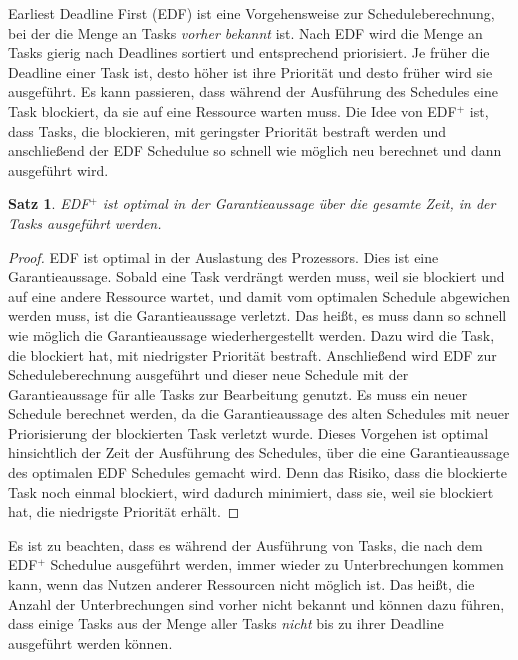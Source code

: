 \documentclass{scrarticle}
\newtheorem{satz}{Satz}[section]
\numberwithin{equation}{section}
\begin{document}
Earliest Deadline First (EDF) ist eine Vorgehensweise zur Scheduleberechnung, bei der die Menge an Tasks \textit{vorher bekannt} ist. Nach EDF wird die Menge an Tasks gierig nach Deadlines sortiert und entsprechend priorisiert. Je früher die Deadline einer Task ist, desto höher ist ihre Priorität und desto früher wird sie ausgeführt. Es kann passieren, dass während der Ausführung des Schedules eine Task blockiert, da sie auf eine Ressource warten muss. Die Idee von EDF$^+$ ist, dass Tasks, die blockieren, mit geringster Priorität bestraft werden und anschließend der EDF Schedulue so schnell wie möglich neu berechnet und dann ausgeführt wird.
\begin{satz}
	\label{satz:edf+}
	EDF$^+$ ist optimal in der Garantieaussage über die gesamte Zeit, in der Tasks ausgeführt werden.
\end{satz}
\begin{proof}
	EDF ist optimal in der Auslastung des Prozessors. Dies ist eine Garantieaussage. Sobald eine Task verdrängt werden muss, weil sie blockiert und auf eine andere Ressource wartet, und damit vom optimalen Schedule abgewichen werden muss, ist die Garantieaussage verletzt. Das heißt, es muss dann so schnell wie möglich die Garantieaussage wiederhergestellt werden. Dazu wird die Task, die blockiert hat, mit niedrigster Priorität bestraft. Anschließend wird EDF zur Scheduleberechnung ausgeführt und dieser neue Schedule mit der Garantieaussage für alle Tasks zur Bearbeitung genutzt. Es muss ein neuer Schedule berechnet werden, da die Garantieaussage des alten Schedules mit neuer Priorisierung der blockierten Task verletzt wurde. Dieses Vorgehen ist optimal hinsichtlich der Zeit der Ausführung des Schedules, über die eine Garantieaussage des optimalen EDF Schedules gemacht wird. Denn das Risiko, dass die blockierte Task noch einmal blockiert, wird dadurch minimiert, dass sie, weil sie blockiert hat, die niedrigste Priorität erhält.
\end{proof}
Es ist zu beachten, dass es während der Ausführung von Tasks, die nach dem EDF$^+$ Schedulue ausgeführt werden, immer wieder zu Unterbrechungen kommen kann, wenn das Nutzen anderer Ressourcen nicht möglich ist. Das heißt, die Anzahl der Unterbrechungen sind vorher nicht bekannt und können dazu führen, dass einige Tasks aus der Menge aller Tasks \textit{nicht} bis zu ihrer Deadline ausgeführt werden können.
\end{document}
